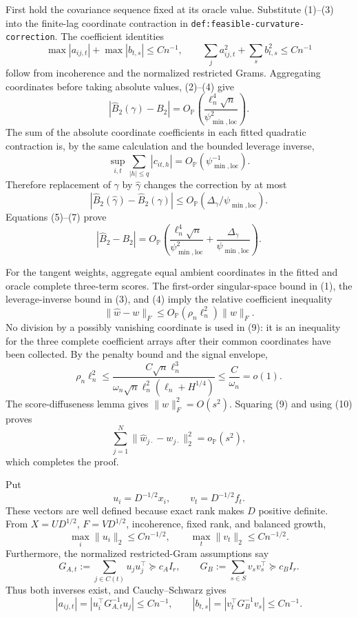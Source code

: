 First hold the covariance sequence fixed at its oracle value.  Substitute (1)--(3) into the finite-lag coordinate contraction in \texttt{def:feasible-curvature-correction}.  The coefficient identities
\[
 \max|a_{ij,t}|+\max|b_{t,s}|\le Cn^{-1},
 \qquad
 \sum_j a_{ij,t}^2+\sum_s b_{t,s}^2\le Cn^{-1}
 \tag{4}
\]
follow from incoherence and the normalized restricted Grams.  Aggregating coordinates before taking absolute values, (2)--(4) give
\[
 |\widehat B_2(\gamma)-B_2|
 =O_{\mathbb P}\!\left(
 \frac{\ell_n^4\sqrt n}{\psi_{\min,\mathrm{loc}}^2}\right).
 \tag{5}
\]
The sum of the absolute coordinate coefficients in each fitted quadratic contraction is, by the same calculation and the bounded leverage inverse,
\[
 \sup_{i,t}\sum_{|h|\le q}|c_{it,h}|
 =O_{\mathbb P}(\psi_{\min,\mathrm{loc}}^{-1}).
 \tag{6}
\]
Therefore replacement of \(\gamma\) by \(\widehat\gamma\) changes the correction by at most
\[
 |\widehat B_2(\widehat\gamma)-\widehat B_2(\gamma)|
 \le O_{\mathbb P}(\Delta_\gamma/\psi_{\min,\mathrm{loc}}).
 \tag{7}
\]
Equations (5)--(7) prove
\[
 |\widehat B_2-B_2|=O_{\mathbb P}\!\left(
 \frac{\ell_n^4\sqrt n}{\psi_{\min,\mathrm{loc}}^2}
 +\frac{\Delta_\gamma}{\psi_{\min,\mathrm{loc}}}\right).
 \tag{8}
\]

For the tangent weights, aggregate equal ambient coordinates in the fitted and oracle complete three-term scores.  The first-order singular-space bound in (1), the leverage-inverse bound in (3), and (4) imply the relative coefficient inequality
\[
 \|\widehat w-w\|_F
 \le O_{\mathbb P}(\rho_n\ell_n^2)\|w\|_F.
 \tag{9}
\]
No division by a possibly vanishing coordinate is used in (9): it is an inequality for the three complete coefficient arrays after their common coordinates have been collected.  By the penalty bound and the signal envelope,
\[
 \rho_n\ell_n^2
 \le
 \frac{C\sqrt n\ell_n^3}
 {\omega_n\sqrt n\ell_n^2(\ell_n+H^{1/4})}
 \le\frac{C}{\omega_n}=o(1).
 \tag{10}
\]
The score-diffuseness lemma gives \(\|w\|_F^2=O(s^2)\).  Squaring (9) and using (10) proves
\[
 \sum_{j=1}^N\|\widehat w_{j\cdot}-w_{j\cdot}\|_2^2
 =o_{\mathbb P}(s^2),
\]
which completes the proof.

Put
\[
 u_i=D^{-1/2}x_i,
 \qquad v_t=D^{-1/2}f_t.
\]
These vectors are well defined because exact rank makes \(D\) positive definite.  From \(X=UD^{1/2}\), \(F=VD^{1/2}\), incoherence, fixed rank, and balanced growth,
\[
 \max_i\|u_i\|_2\le Cn^{-1/2},
 \qquad
 \max_t\|v_t\|_2\le Cn^{-1/2}.
 \tag{1}
\]
Furthermore, the normalized restricted-Gram assumptions say
\[
 G_{A,t}:=\sum_{j\in C(t)}u_ju_j^{\top}\succeq c_AI_r,
 \qquad
 G_B:=\sum_{s\in S}v_sv_s^{\top}\succeq c_BI_r.
 \tag{2}
\]
Thus both inverses exist, and Cauchy--Schwarz gives
\[
 |a_{ij,t}|=|u_i^{\top}G_{A,t}^{-1}u_j|\le Cn^{-1},
 \qquad
 |b_{t,s}|=|v_t^{\top}G_B^{-1}v_s|\le Cn^{-1}.
 \tag{3}
\]

